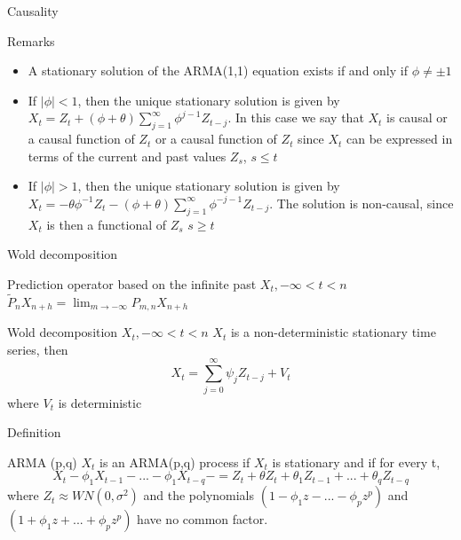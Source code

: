 \documentclass[11pt]{beamer}
\begin{document}
\begin{frame}{Causality \cite{brockwell2002introduction}}
\begin{block}{Remarks}
\begin{itemize}
\item A stationary solution of the ARMA(1,1) equation exists if and only if $\phi \neq \pm 1$
\item If $|\phi| < 1$, then the unique stationary solution is given by $X_{t}=Z_{t}+(\phi+\theta)\sum^{\infty}_{j=1}\phi^{j-1}Z_{t-j}$. In this case we say that $X_{t}$ is causal or a causal function of ${Z_{t}}$ or a causal function of ${Z_{t}}$ since $X_{t}$ can be expressed in terms of the current and past values $Z_{s}$, $s\leq t$
\item If $|\phi| >1$, then the unique stationary solution is given by $X_{t}=-\theta\phi^{-1}Z_{t}-(\phi+\theta)\sum^{\infty}_{j=1}\phi^{-j-1}Z_{t-j}$. The solution is non-causal, since $X_{t}$ is then a functional of $Z_{s}$ $s\geq t$
\end{itemize}
\end{block}
\end{frame}

\begin{frame}{Wold decomposition \cite{brockwell2002introduction}}
\begin{block}{Prediction operator based on the infinite past $X_{t},-\infty < t < n$}
$\tilde{P}_{n}X_{n+h}=\lim_{m\rightarrow - \infty} P_{m,n}X_{n+h}$
\end{block}
\begin{block}{Wold decomposition $X_{t},-\infty < t < n$}
$X_{t}$ is a non-deterministic stationary time series, then
\begin{equation*}
X_{t}=\sum^{\infty}_{j=0}\psi_{j}Z_{t-j}+V_{t}
\end{equation*}
where ${V_{t}}$ is deterministic
\end{block}
\end{frame}

\begin{frame}{Definition \cite{brockwell2002introduction}}
\begin{alertblock}{ARMA (p,q)}
${X_{t}}$ is an ARMA(p,q) process if ${X_{t}}$ is stationary and if for every t, 
\begin{equation*}
X_{t}-\phi_{1} X_{t-1}-...-\phi_{1} X_{t-q}-=Z_{t}+\theta Z_{t}+\theta_{1}Z_{t-1}+...+\theta_{q}Z_{t-q}
\end{equation*}
where ${Z_{t}} \approx WN(0,\sigma^{2})$ and the polynomials $\left(1-\phi_{1}z-...-\phi_{p}z^{p}\right)$ and $\left(1+\phi_{1}z+...+\phi_{p}z^{p}\right)$ have no common factor. 
\end{alertblock}
\end{frame}
\end{document}
